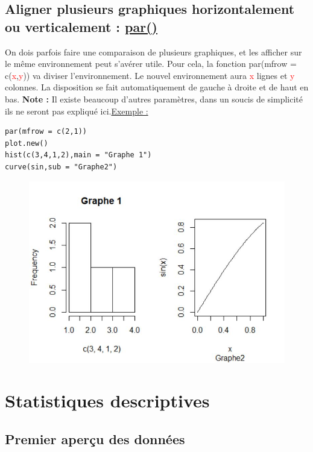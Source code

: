 \documentclass{article}
\newcommand{\argument}[1]{\textcolor{red}{#1}}
\begin{document}
\subsection{Aligner plusieurs graphiques horizontalement ou verticalement : \href{https://www.datamentor.io/r-programming/subplot/}{par()}}
On dois parfois faire une comparaison de plusieurs graphiques, et les afficher sur le même environnement peut s'avérer utile. Pour cela, la fonction par(mfrow = c(\argument{x},\argument{y})) va diviser l'environnement. Le nouvel environnement aura \argument{x} lignes et \argument{y} colonnes. La disposition se fait automatiquement de gauche à droite et de haut en bas. \newline \textbf{Note : } Il existe beaucoup d'autres paramètres, dans un soucis de simplicité ils ne seront pas expliqué ici.\newline \underline{Exemple : }
\begin{verbatim}
par(mfrow = c(2,1))
plot.new()
hist(c(3,4,1,2),main = "Graphe 1")
curve(sin,sub = "Graphe2")
\end{verbatim}
\begin{figure}[!h]
    \centering
    \includegraphics[scale = 0.7]{par.JPG}
\end{figure}

\newpage
\section{Statistiques descriptives}

\subsection{Premier aperçu des données}
\end{document}
